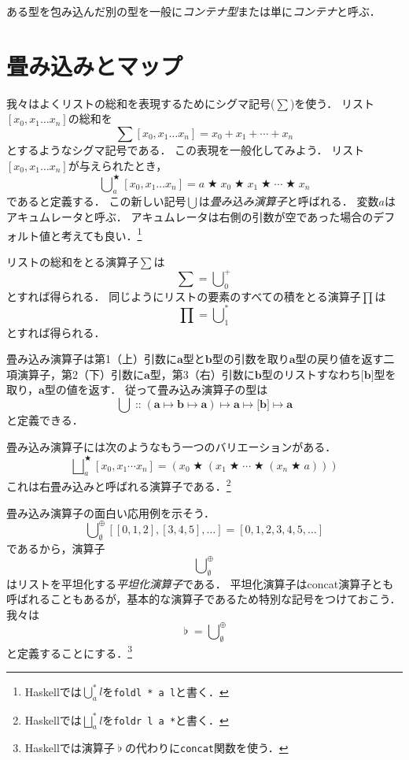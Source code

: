 \documentclass[twocolumn]{jsbook}
\newcommand{\hsklType}[1]{\textbf{#1}}
\DeclareMathOperator{\hsklConcat}{\flat}
\newcommand{\hsklAppend}{\oplus}
\newcommand{\hsklEmptyList}{\emptyset}
\newcommand{\hsklListType}[1]{\boldsymbol{[}#1\boldsymbol{]}}
\DeclareMathOperator{\mathAnyBinaryOperator}{\bigstar}
\DeclareMathOperator{\mathIn}{::}
\DeclareMathOperator*{\mathFold}{\bigcup}
\DeclareMathOperator*{\mathFoldRight}{\bigsqcup}
\DeclareMathOperator{\mathMapsTo}{\mapsto}
\newcommand{\mathMorphII}[3]{#1\mathMapsTo#2\mathMapsTo#3}
\newcommand{\mathMorphIII}[4]{#1\mathMapsTo#2\mathMapsTo#3\mathMapsTo#4}
\newcommand{\keyword}[1]{\emph{#1}}
\newcommand{\code}[1]{\texttt{#1}}
\begin{document}
ある型を包み込んだ別の型を一般に\keyword{コンテナ型}または単に\keyword{コンテナ}と呼ぶ．

\section{畳み込みとマップ}

我々はよくリストの総和を表現するためにシグマ記号($\sum$)を使う．
リスト$[x_0,x_1\dots x_n]$の総和を$$\sum[x_0,x_1\dots x_n]=x_0+x_1+\dotsb+x_n$$とするようなシグマ記号である．
この表現を一般化してみよう．
リスト$[x_0,x_1\dots x_n]$が与えられたとき，$$\mathFold^{\mathAnyBinaryOperator}_{a}[x_0,x_1\dots x_n]=a\mathAnyBinaryOperator x_0\mathAnyBinaryOperator x_1\mathAnyBinaryOperator\dotsb\mathAnyBinaryOperator x_n$$であると定義する．
この新しい記号$\mathFold$は\keyword{畳み込み演算子}と呼ばれる．
変数$a$はアキュムレータと呼ぶ．
アキュムレータは右側の引数が空であった場合のデフォルト値と考えても良い．\footnote{Haskellでは$\mathFold^{*}_{a}l$を\code{foldl * a l}と書く．}

リストの総和をとる演算子$\sum$は$$\sum=\mathFold^+_0$$とすれば得られる．
同じようにリストの要素のすべての積をとる演算子$\prod$は$$\prod=\mathFold^*_1$$とすれば得られる．

畳み込み演算子は第1（上）引数に$\hsklType{a}$型と$\hsklType{b}$型の引数を取り$\hsklType{a}$型の戻り値を返す二項演算子，第2（下）引数に$\hsklType{a}$型，第3（右）引数に$\hsklType{b}$型のリストすなわち$\hsklListType{\hsklType{b}}$型を取り，$\hsklType{a}$型の値を返す．
従って畳み込み演算子の型は$$\mathFold\mathIn\mathMorphIII{(\mathMorphII{\hsklType{a}}{\hsklType{b}}{\hsklType{a}})}{\hsklType{a}}{\hsklListType{\hsklType{b}}}{\hsklType{a}}$$と定義できる．

畳み込み演算子には次のようなもう一つのバリエーションがある．
$$\mathFoldRight^{\mathAnyBinaryOperator}_{a}[x_0,x_1\dotsb x_n]=\left(x_0\mathAnyBinaryOperator\left(x_1\mathAnyBinaryOperator\dotsb\mathAnyBinaryOperator\left(x_n\mathAnyBinaryOperator a\right)\right)\right)$$
これは右畳み込みと呼ばれる演算子である．\footnote{Haskellでは$\mathFoldRight^{*}_{a}l$を\code{foldr l a *}と書く．}

畳み込み演算子の面白い応用例を示そう．
$$\mathFold_\hsklEmptyList^\hsklAppend[[0,1,2],[3,4,5],\dots]=[0,1,2,3,4,5,\dots]$$
であるから，演算子$$\mathFold_\hsklEmptyList^\hsklAppend$$はリストを平坦化する\keyword{平坦化演算子}である．
平坦化演算子はconcat演算子とも呼ばれることもあるが，基本的な演算子であるため特別な記号をつけておこう．
我々は$$\hsklConcat=\mathFold_\hsklEmptyList^\hsklAppend$$と定義することにする．\footnote{Haskellでは演算子$\hsklConcat$の代わりに\code{concat}関数を使う．}
\end{document}
